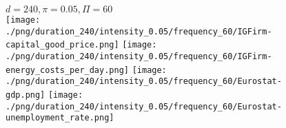 \begin{figure}[ht!]
\centering\leavevmode
\begin{minipage}{13cm}
\centering\leavevmode
{$d=240, \pi=0.05, \Pi=60$}\\
\texttt{[image: ./png/duration\_240/intensity\_0.05/frequency\_60/IGFirm-capital\_good\_price.png]}
\texttt{[image: ./png/duration\_240/intensity\_0.05/frequency\_60/IGFirm-energy\_costs\_per\_day.png]}
\texttt{[image: ./png/duration\_240/intensity\_0.05/frequency\_60/Eurostat-gdp.png]}
\texttt{[image: ./png/duration\_240/intensity\_0.05/frequency\_60/Eurostat-unemployment\_rate.png]}
\end{minipage}
\end{figure}

